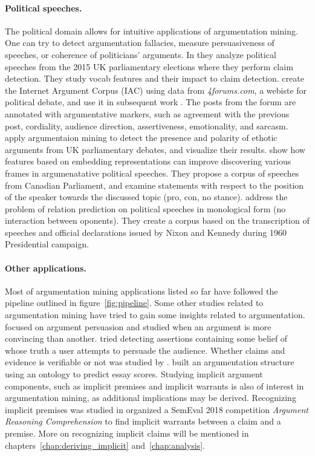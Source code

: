 \paragraph{Political speeches. }
The political domain allows for intuitive applications of argumentation mining. 
One can try to detect argumentation fallacies, measure persuasiveness of speeches, or
coherence of politicians' arguments. 
In \citep{lippi2016argument} they analyze political speeches from the 2015
UK parliamentary elections where they perform claim detection. 
They study vocab features and their impact to claim detection. 
\citet{walker2012corpus} create the Internet Argument Corpus (IAC) using
data from \emph{4forums.com}, a webiste for political debate, and use it
in subsequent work \citep{walker2012stance, abbott2016internet}. 
The posts from the forum are annotated with argumentative markers, such
as agreement with the previous post, cordiality, audience direction, 
assertiveness, emotionality, and sarcasm. 
\citet{duthie2016mining} apply argumentaion mining to detect the presence and polarity 
of ethotic arguments from UK parliamentary debates, and visualize their results. 
\citet{naderi2015argumentation}  show how features based on embedding representations 
can improve discovering various frames in argumenatative political speeches.
They propose a corpus of speeches from Canadian Parliament, and examine statements 
with respect to the position of the speaker towards the discussed topic (pro, con, no stance).
\citet{menini2018never} address the problem of relation prediction on 
political speeches in monological form (no interaction between oponents).
They create a corpus based on the transcription of speeches and official declarations 
issued by Nixon and Kennedy during 1960 Presidential campaign.

\paragraph{Other applications. } Most of argumentation mining
applications listed so far have followed 
the pipeline outlined in figure~\ref{fig:pipeline}. 
Some other studies related to argumentation mining have tried to gain 
some insights related to argumentation. 
\citet{habernal2016argument} focused on argument persuasion and studied
when an argument is more convincing than another. 
\citet{rosenthal2012detecting} tried detecting assertions containing some belief
of whose truth a user attempts to persuade the audience.
Whether claims and evidence is verifiable or not was studied by
\citep{park2014identifying, park2015conditional}.
\citet{ong2014ontology} built an argumentation structure using an ontology to
predict essay scores. 
Studying implicit argument components, such as implicit premises and implicit
warrants is also of interest in argumentation mining, as additional
implications may be derived.  Recognizing implicit premises was studied in
\citep{park2015conditional, boltuzic2016fill} \citet{habernal2017argument}
organized a SemEval 2018 competition \emph{Argument Reasoning Comprehension} to
find implicit warrants between a claim and a premise.  More on recognizing
implicit claims will be mentioned in chapters~\ref{chap:deriving_implicit}
and~\ref{chap:analysis}.

